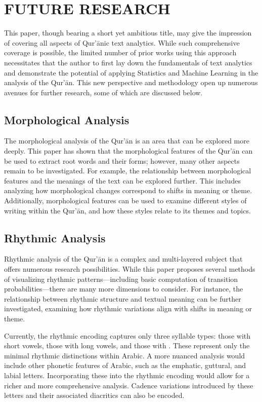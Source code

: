 \chapter{FUTURE RESEARCH}\label{ch:future_research}

This paper, though bearing a short yet ambitious title, may give the impression of covering all aspects of Qur'\=anic text analytics. While such comprehensive coverage is possible, the limited number of prior works using this approach necessitates that the author to first lay down the fundamentals of text analytics and demonstrate the potential of applying Statistics and Machine Learning in the analysis of the Qur'\=an. This new perspective and methodology open up numerous avenues for further research, some of which are discussed below.

\section{Morphological Analysis}

The morphological analysis of the Qur'\=an is an area that can be explored more deeply. This paper has shown that the morphological features of the Qur'\=an can be used to extract root words and their forms; however, many other aspects remain to be investigated. For example, the relationship between morphological features and the meanings of the text can be explored further. This includes analyzing how morphological changes correspond to shifts in meaning or theme. Additionally, morphological features can be used to examine different styles of writing within the Qur'\=an, and how these styles relate to its themes and topics.

\section{Rhythmic Analysis}

Rhythmic analysis of the Qur'\=an is a complex and multi-layered subject that offers numerous research possibilities. While this paper proposes several methods of visualizing rhythmic patterns—including basic computation of transition probabilities—there are many more dimensions to consider. For instance, the relationship between rhythmic structure and textual meaning can be further investigated, examining how rhythmic variations align with shifts in meaning or theme.

Currently, the rhythmic encoding captures only three syllable types: those with short vowels, those with long vowels, and those with  . These represent only the minimal rhythmic distinctions within Arabic. A more nuanced analysis would include other phonetic features of Arabic, such as the emphatic, guttural, and labial letters. Incorporating these into the rhythmic encoding would allow for a richer and more comprehensive analysis. Cadence variations introduced by these letters and their associated diacritics can also be encoded.

